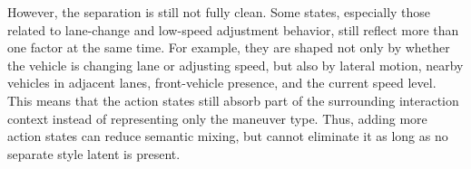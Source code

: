 \par However, the separation is still not fully clean. 
Some states, especially those related to lane-change and low-speed adjustment behavior, still reflect more than one factor at the same time. 
For example, they are shaped not only by whether the vehicle is changing lane or adjusting speed, but also by lateral motion, nearby vehicles in 
adjacent lanes, front-vehicle presence, and the current speed level. 
This means that the action states still absorb part of the surrounding interaction context instead of representing only the maneuver type. 
Thus, adding more action states can reduce semantic mixing, but cannot eliminate it as long as no separate style latent is present. 





